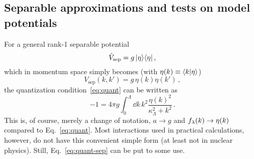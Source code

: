 	\subsection{Separable approximations and tests on model potentials}
	\label{subsec:Separable_approximation}

	For a general rank-1 separable potential
	\begin{equation}
	 \hat{V}_\text{sep} = g \, {|\eta\rangle}{\langle\eta|} \,,
	\end{equation}
	which in momentum space simply becomes (with $\eta(k)\equiv{\langle k|\eta\rangle}$)
	\begin{equation}
	 V_\text{sep}(k,k') = g \, \eta(k)\eta(k') \,,
	\end{equation}
	the quantization condition~\eqref{eq:quant} can be written as
	\begin{equation}
	 -1 = 4\pi g
	 \int_0^\Lambda\!\dd k\, k^2 \frac{\eta(k)^2}{\kappa^2_\Lambda+k^2} \,.
	\label{eq:quant-sep}
	\end{equation}
	This is, of course, merely a change of notation, $a \rightarrow g$ and
	$f_{\lambda}(k)\rightarrow\eta(k)$ compared to Eq.~\eqref{eq:quant}.  Most
	interactions used in practical calculations, however, do not have this
	convenient simple form (at least not in nuclear physics).  Still,
	Eq.~\eqref{eq:quant-sep} can be put to some use.

